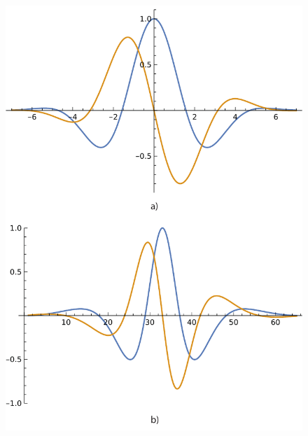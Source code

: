 \documentclass{beamer}
\begin{document}
\begin{frame}
\begin{columns}
\begin{column}
\begin{figure}
				\includegraphics[width=0.89
				\textwidth]{../report/iris/impulse_response} \label{fig:impulse_response} 
			\end{figure}
		\end{column}
	\end{columns}
\end{frame}
\end{document}
